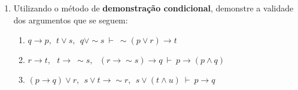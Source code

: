 \documentclass[12pt, a4paper,final]{article}
\begin{document}
\begin{enumerate}
\begin{enumerate}


\end{enumerate}


 \item Utilizando o m\'etodo de {\bf demonstra\c c\~ao condicional}, demonstre a validade dos argumentos que se seguem:
 
\begin{enumerate}






\item $ q \rightarrow p,\:\: t \vee s,\:\: q \vee\sim s ~\vdash~ \sim (p \vee r) \rightarrow t$

\item $ r \rightarrow t, \:\: ~ t \rightarrow ~ \sim s,\:\:
  ~ (r \rightarrow \sim s) \rightarrow q ~\vdash~  p \rightarrow (p \wedge q) $ 

\item \((p \rightarrow q) \vee r,\:\: s \vee t \rightarrow \sim r, \:\: s \vee (t \wedge u) ~\vdash~ p \rightarrow q\)

\begin{comment}

PRONTAS PARA o FUTURO


\end{comment}
\end{enumerate}
\end{enumerate}
\end{document}
